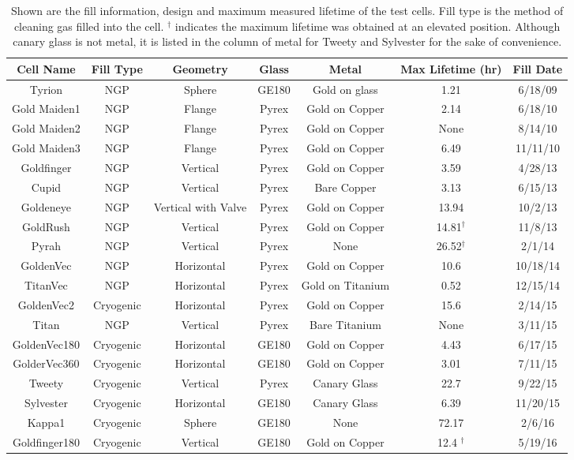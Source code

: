 \documentclass[pdftex,letterpaper,12pt]{report}
\begin{document}
\begin{table}\scriptsize
	\captionsetup{font=scriptsize}
	\begin{center}
		\def\arraystretch{0.75}
		\setlength\tabcolsep{2pt}
		\begin{tabular}{|c|c|c|c|c|c|c|}
			\hline
			Cell Name & Fill Type & Geometry & Glass & Metal & Max Lifetime (hr) & Fill Date\\ \hline
			Tyrion & NGP & Sphere & GE180 & Gold on glass & 1.21 & 6/18/09 \\ \hline
			Gold Maiden1 & NGP & Flange & Pyrex & Gold on Copper & 2.14 & 6/18/10 \\ \hline
			Gold Maiden2 & NGP & Flange & Pyrex & Gold on Copper & None & 8/14/10\\ \hline
			Gold Maiden3 & NGP & Flange & Pyrex & Gold on Copper & 6.49 & 11/11/10\\ \hline
			Goldfinger & NGP & Vertical & Pyrex & Gold on Copper & 3.59 & 4/28/13\\ \hline
			Cupid & NGP & Vertical & Pyrex & Bare Copper & 3.13 & 6/15/13\\ \hline
			Goldeneye & NGP & Vertical with Valve & Pyrex & Gold on Copper & 13.94 & 10/2/13\\ \hline
			GoldRush & NGP & Vertical & Pyrex & Gold on Copper & 14.81$^\dagger$  & 11/8/13\\ \hline
			Pyrah & NGP & Vertical & Pyrex & None & 26.52$^\dagger$ & 2/1/14\\ \hline
			GoldenVec & NGP & Horizontal & Pyrex & Gold on Copper & 10.6 & 10/18/14\\ \hline
			TitanVec & NGP & Horizontal & Pyrex & Gold on Titanium & 0.52 & 12/15/14\\ \hline
			GoldenVec2 & Cryogenic & Horizontal & Pyrex & Gold on Copper & 15.6 & 2/14/15\\ \hline
			Titan & NGP & Vertical & Pyrex & Bare Titanium & None & 3/11/15\\ \hline
			GoldenVec180 & Cryogenic & Horizontal & GE180 & Gold on Copper & 4.43 & 6/17/15\\ \hline
			GolderVec360 & Cryogenic & Horizontal & GE180 & Gold on Copper & 3.01 & 7/11/15\\ \hline
			Tweety & Cryogenic & Vertical & Pyrex & Canary Glass & 22.7 & 9/22/15 \\ \hline
			Sylvester & Cryogenic & Horizontal & GE180 & Canary Glass & 6.39 & 11/20/15\\ \hline
			Kappa1 & Cryogenic & Sphere & GE180 & None & 72.17 & 2/6/16\\ \hline
			Goldfinger180 & Cryogenic & Vertical & GE180 & Gold on Copper & 12.4 $^\dagger$ & 5/19/16\\ \hline
		\end{tabular}
		\caption
		{Shown are the fill information, design and maximum measured lifetime of the test cells. Fill type is the method of cleaning gas filled into the cell. $^\dagger$ indicates the maximum lifetime was obtained at an elevated position. Although canary glass is not metal, it is listed in the column of metal for Tweety and Sylvester for the sake of convenience.}
		\label{test_cells}
	\end{center}
\end{table}
\end{document}
